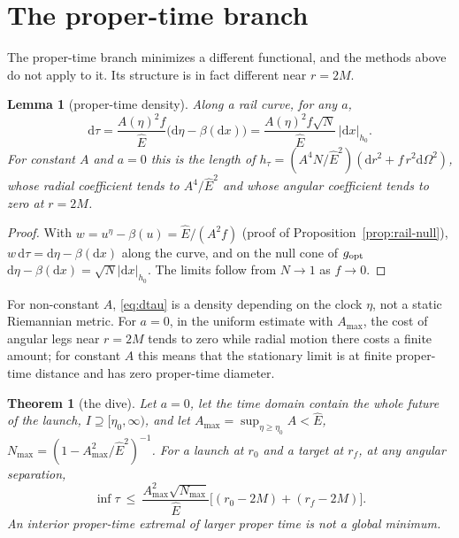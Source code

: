 \documentclass[aip,jmp,amsmath,amssymb,reprint]{revtex4-2}
\newcommand{\Ehat}{\hat E}
\newcommand{\dd}{\mathrm{d}}
\newcommand{\gopt}{g_{\rm opt}}
\theoremstyle{plain}
\newtheorem{theorem}{Theorem}
\newtheorem{lemma}[proposition]{Lemma}
\theoremstyle{definition}
\begin{document}
\section{The proper-time branch}
\label{sec:tau}
The proper-time branch minimizes a different functional, and the methods above do not
apply to it. Its structure is in fact different near $r=2M$.

\begin{lemma}[proper-time density]\label{lem:tau-density}
Along a rail curve, for any $a$,
\begin{equation}
  \dd\tau=\frac{A(\eta)^2f}{\Ehat}\big(\dd\eta-\beta(\dd x)\big)
  =\frac{A(\eta)^2f\sqrt N}{\Ehat}\,|\dd x|_{h_0} .
  \label{eq:dtau}
\end{equation}
For constant $A$ and $a=0$ this is the length of
$h_\tau=(A^4N/\Ehat^2)(\dd r^2+f\,r^2\dd\Omega^2)$, whose radial coefficient tends to
$A^4/\Ehat^2$ and whose angular coefficient tends to zero at $r=2M$.
\end{lemma}

\begin{proof}
With $w=u^\eta-\beta(u)=\Ehat/(A^2f)$ (proof of Proposition~\ref{prop:rail-null}),
$w\,\dd\tau=\dd\eta-\beta(\dd x)$ along the curve, and on the null cone of $\gopt$
$\dd\eta-\beta(\dd x)=\sqrt N|\dd x|_{h_0}$. The limits follow from $N\to1$ as $f\to0$.
\end{proof}

For non-constant $A$, \eqref{eq:dtau} is a density depending on the clock $\eta$, not a
static Riemannian metric. For $a=0$, in the uniform estimate with $A_{\max}$, the cost of
angular legs near $r=2M$ tends to zero while radial motion there costs a finite amount; for
constant $A$ this means that the stationary limit is at finite proper-time distance and has
zero proper-time diameter.

\begin{theorem}[the dive]\label{thm:dive}
Let $a=0$, let the time domain contain the whole future of the launch, $I\supseteq[\eta_0,\infty)$,
and let $A_{\max}=\sup_{\eta\ge\eta_0}A<\Ehat$, $N_{\max}=(1-A_{\max}^2/\Ehat^2)^{-1}$. For a launch at
$r_0$ and a target at $r_f$, at any angular separation,
\[
  \inf\tau\ \le\ \frac{A_{\max}^2\sqrt{N_{\max}}}{\Ehat}\big[(r_0-2M)+(r_f-2M)\big].
\]
An interior proper-time extremal of larger proper time is not a global minimum.
\end{theorem}
\end{document}
